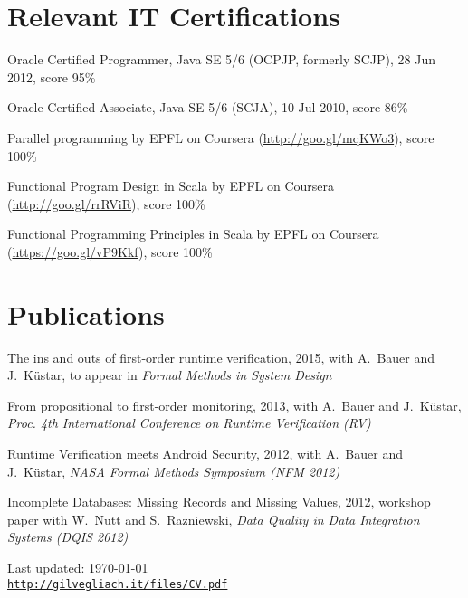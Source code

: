 \documentclass[letterpaper]{article}
\def\footerlink{http://gilvegliach.it/files/CV.pdf}
\newenvironment{no-indent-itemize}{
  \begin{list}{}{
    \setlength{\leftmargin}{0em}
  }
}{
  \end{list}
}
\begin{document}
\section*{Relevant IT Certifications}
\begin{no-indent-itemize}
  \item Oracle Certified Programmer, Java SE 5/6 (OCPJP, formerly SCJP), 28 Jun 2012, score 95\%
  \item Oracle Certified Associate, Java SE 5/6 (SCJA), 10 Jul 2010, score 86\%
  \item Parallel programming by EPFL on Coursera 
        (\href{http://goo.gl/mqKWo3}{http://goo.gl/mqKWo3}), score 100\%
  \item Functional Program Design in Scala by EPFL on Coursera 
        (\href{https://goo.gl/vP9Kkf}{http://goo.gl/rrRViR}), score 100\%
  \item Functional Programming Principles in Scala by EPFL on Coursera 
        (\href{https://goo.gl/vP9Kkf}{https://goo.gl/vP9Kkf}), score 100\%
\end{no-indent-itemize}

\section*{Publications}
\begin{no-indent-itemize}
  \item The ins and outs of first-order runtime verification, 2015, with A.~Bauer and J.~K\"{u}star, 
        to appear in {\it Formal Methods in System Design}
  \item From propositional to first-order monitoring, 2013, with A.~Bauer and J.~K\"{u}star, 
        {\it Proc. 4th International Conference on Runtime Verification (RV)}
  \item Runtime Verification meets Android Security, 2012, with A.~Bauer and J.~K\"{u}star, 
        {\it NASA Formal Methods Symposium (NFM 2012)}
  \item Incomplete Databases: Missing Records and Missing Values, 2012, workshop paper with 
        W.~Nutt and S.~Razniewski, {\it Data Quality in Data Integration Systems (DQIS 2012)}
\end{no-indent-itemize}

\bigskip
\begin{center}
  \begin{footnotesize}
    Last updated: \today \\
    \href{\footerlink}{\texttt{\footerlink}}
  \end{footnotesize}
\end{center}
\end{document}
